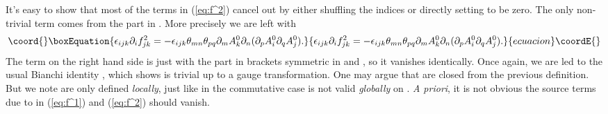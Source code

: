\documentclass[a4paper,12pt]{article}
\begin{document}
\vskip -0.5cm
\noindent It's easy to show that most of the terms in (\ref{eq:f^2}) cancel
out by either shuf\mbox{}f\mbox{}ling the indices or directly 
setting \coordHE{} to be zero.
The only non-trivial term comes from the \coordHE{} part in \coordHE{}. More precisely
we are left with
\begin{equation}\coord{}\boxEquation{
\epsilon_{ijk}\partial_i f^2_{jk}=-\epsilon_{ijk}\theta_{mn}\theta_{pq}
            \partial_m A^0_k\partial_n (\partial_p A^0_i\partial_q A^0_j).
}{
\epsilon_{ijk}\partial_i f^2_{jk}=-\epsilon_{ijk}\theta_{mn}\theta_{pq}
            \partial_m A^0_k\partial_n (\partial_p A^0_i\partial_q A^0_j).
}{ecuacion}\coordE{}\end{equation} 
The term on the right hand side is just \coordHE{} with the part in brackets
symmetric in \coordHE{} and \coordHE{}, so it vanishes identically. Once again, we are
led to the usual Bianchi identity \coordHE{}, which shows \coordHE{} is trivial
up to a gauge transformation. 
One may argue that \coordHE{} are closed from the previous def\mbox{}inition.
But we note \coordHE{} are only def\mbox{}ined \emph{locally},
just like in the commutative case \coordHE{} is not valid \emph{globally}
on \coordHE{}. {\it A priori}, it is not obvious the source terms due to \coordHE{} in
(\ref{eq:f^1}) and (\ref{eq:f^2}) should vanish.
\end{document}
